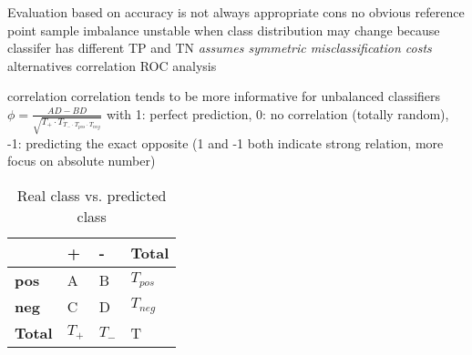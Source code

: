 \begin{outline}
    \1 Evaluation based on accuracy is not always appropriate
    \1 cons
        \2 no obvious reference point
            \3 sample imbalance
        \2 unstable when class distribution may change
            \3 because classifer has different TP and TN
        \2 \emph{assumes symmetric misclassification costs}
    \1 alternatives
        \2 correlation
        \2 ROC analysis
\end{outline}

\begin{outline}
    \1 correlation
        \2 correlation tends to be more informative for unbalanced classifiers
        \2 $\phi = \frac{AD - BD}{\sqrt{T_{+} \cdot T_{T_{-} \cdot T_{pos} \cdot T_{neg}}}}$ with 1: perfect prediction, 0: no correlation (totally random), -1: predicting the exact opposite (1 and -1 both indicate strong relation, more focus on absolute number)
\end{outline}

\begin{table}[htbp]\footnotesize
    \centering
    \caption{Real class vs. predicted class}
    \begin{tabularx}{\textwidth}{X|X|X|X}
    \toprule
    \textbf{ }&\textbf{+}&\textbf{-}&\textbf{Total} \\
    \hline
    \textbf{pos}&A&B&$T_{pos}$ \\
    \hline
    \textbf{neg}&C&D&$T_{neg}$ \\
    \hline
    \textbf{Total}&$T_{+}$&$T_{-}$&T \\
    \bottomrule
    \end{tabularx}
    \label{tab:real_predicted_class_table}
\end{table}

